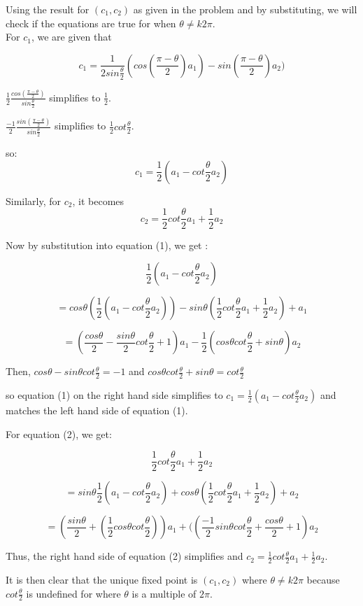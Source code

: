 \documentclass[12pt]{article}
\begin{document}
Using the result for $(c_1,c_2)$ as given in the problem and by substituting, we will check if the equations are true for when $\theta\ne k2\pi$.\\

For $c_1$, we are given that
  
$$c_1=\frac{1}{2sin\frac{\theta}{2}} (cos(\frac{\pi - \theta}{2})a_1)- sin(\frac{\pi- \theta}{2})a_2)$$


 $\frac{1}{2}\frac{cos(\frac{\pi - \theta}{2})}{sin\frac{\theta}{2}}$ simplifies to $\frac{1}{2}$.

 $\frac{-1}{2}\frac{sin(\frac{\pi - \theta}{2})}{sin\frac{\theta}{2}}$ simplifies to $ \frac{1}{2}cot \frac{\theta}{2}$.

so: $$c_1 = \frac{1}{2} (a_1 - cot \frac{\theta}{2}a_2)$$

Similarly, for $c_2$,  it becomes
$$c_2= \frac{1}{2}cot\frac {\theta}{2}a_1 + \frac{1}{2}a_2$$

Now by substitution into equation (1), we get :

$$\frac{1}{2} (a_1 - cot \frac{\theta}{2}a_2)$$

$$=cos\theta(\frac{1}{2} (a_1 - cot \frac{\theta}{2}a_2)) - sin\theta(\frac{1}{2}cot\frac {\theta}{2}a_1 + \frac{1}{2}a_2) + a_1$$

$$=(\frac{cos\theta}{2} - \frac{sin\theta}{2}cot\frac{\theta}{2} +1)a_1 - \frac{1}{2}(cos\theta cot\frac{\theta}{2} + sin\theta)a_2$$


Then, $cos\theta - sin\theta cot \frac{\theta}{2} = -1$ and $cos\theta cot \frac{\theta}{2} + sin\theta = cot \frac{\theta}{2}$

so equation (1) on the right hand side simplifies to  $c_1 = \frac{1}{2} (a_1 - cot \frac{\theta}{2}a_2)$ and matches the left hand side of equation (1).

For equation (2), we get:

$$\frac{1}{2}cot\frac {\theta}{2}a_1 + \frac{1}{2}a_2$$

$$=sin\theta\frac{1}{2} (a_1 - cot \frac{\theta}{2}a_2)+ cos\theta(\frac{1}{2}cot\frac {\theta}{2}a_1 + \frac{1}{2}a_2) + a_2$$

$$=(\frac{sin\theta}{2} + (\frac{1}{2} cos\theta cot\frac{\theta}{2}))a_1 +((\frac{-1}{2}sin\theta cot\frac{\theta}{2} + \frac{cos\theta}{2} +1)a_2$$

Thus, the right hand side of equation (2) simplifies and $c_2= \frac{1}{2}cot\frac {\theta}{2}a_1 + \frac{1}{2}a_2$.



It is then clear that the unique fixed point is $(c_1,c_2)$ where $\theta\ne k2\pi$ because $cot\frac{\theta}{2}$ is undefined for where $\theta$ is a multiple of $2\pi$.
\end{document}
